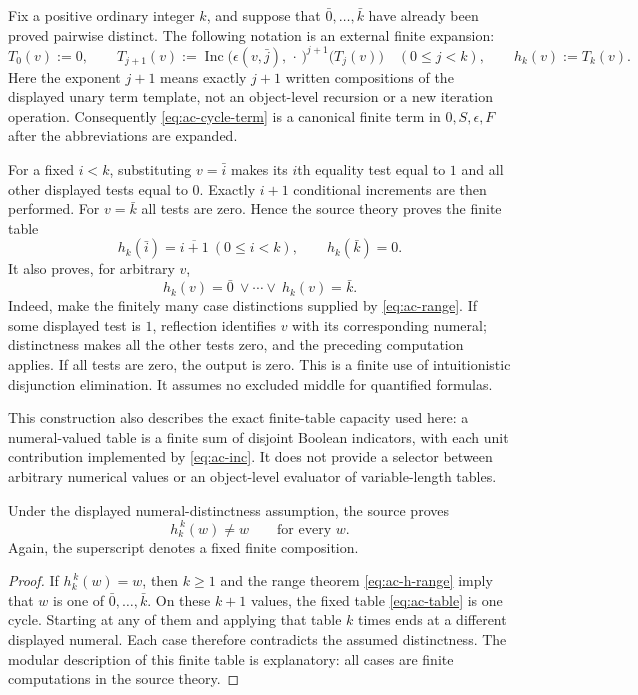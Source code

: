 Fix a positive ordinary integer $k$, and suppose that
$\bar0,\ldots,\bar k$ have already been proved pairwise distinct.
The following notation is an external finite expansion:
\[
 T_0(v):=0,\qquad
 T_{j+1}(v):=
 \operatorname{Inc}\bigl(\epsilon(v,\bar j),\,\cdot\,\bigr)^{j+1}
                      \bigl(T_j(v)\bigr)
 \quad(0\le j<k),\qquad
 h_k(v):=T_k(v).
 \tag{Finite cycle term}\label{eq:ac-cycle-term}
\]
Here the exponent $j+1$ means exactly $j+1$ written compositions of the
displayed unary term template, not an object-level recursion or a new
iteration operation. Consequently \eqref{eq:ac-cycle-term} is a canonical
finite term in $0,S,\epsilon,F$ after the abbreviations are expanded.

For a fixed $i<k$, substituting $v=\bar i$ makes its $i$th equality test
equal to $1$ and all other displayed tests equal to $0$. Exactly $i+1$
conditional increments are then performed. For $v=\bar k$ all tests are
zero. Hence the source theory proves the finite table
\begin{equation}
 h_k(\bar i)=\overline{i+1}\ (0\le i<k),\qquad
 h_k(\bar k)=0.
 \label{eq:ac-table}
\end{equation}
It also proves, for arbitrary $v$,
\begin{equation}
 h_k(v)=\bar0\ \lor\cdots\lor\ h_k(v)=\bar k.
 \label{eq:ac-h-range}
\end{equation}
Indeed, make the finitely many case distinctions supplied by
\eqref{eq:ac-range}. If some displayed test is $1$, reflection identifies
$v$ with its corresponding numeral; distinctness makes all the other
tests zero, and the preceding computation applies. If all tests are zero,
the output is zero. This is a finite use of intuitionistic disjunction
elimination. It assumes no excluded middle for quantified formulas.

This construction also describes the exact finite-table capacity used
here: a numeral-valued table is a finite sum of disjoint Boolean
indicators, with each unit contribution implemented by
\eqref{eq:ac-inc}. It does not provide a selector between arbitrary
numerical values or an object-level evaluator of variable-length tables.

\begin{lemma}
\label{lem:ac-finite-update}
Under the displayed numeral-distinctness assumption, the source proves
\[
                       h_k^{\,k}(w)\ne w
                       \qquad\text{for every }w.
\]
Again, the superscript denotes a fixed finite composition.
\end{lemma}
\begin{proof}
If $h_k^{\,k}(w)=w$, then $k\ge1$ and the range theorem
\eqref{eq:ac-h-range} imply that $w$ is one of
$\bar0,\ldots,\bar k$. On these $k+1$ values, the fixed table
\eqref{eq:ac-table} is one cycle. Starting at any of them and applying
that table $k$ times ends at a different displayed numeral. Each case
therefore contradicts the assumed distinctness. The modular description
of this finite table is explanatory: all cases are finite computations
in the source theory.
\end{proof}

